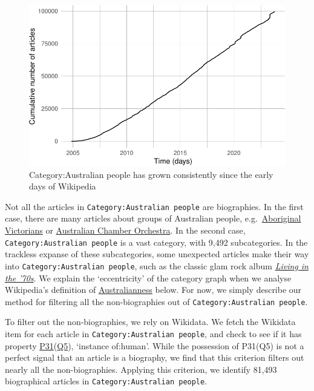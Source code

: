 \documentclass[
  a4paper,
  DIV=11,
  numbers=noendperiod]{scrreprt}
\begin{document}
\begin{figure}

{\centering \includegraphics{who-counts_files/figure-pdf/fig-included-in-ozpeople-over-time-1.pdf}

}

\caption{\label{fig-included-in-ozpeople-over-time}Category:Australian
people has grown consistently since the early days of Wikipedia}

\end{figure}

Not all the articles in \texttt{Category:Australian\ people} are
biographies. In the first case, there are many articles about groups of
Australian people,
e.g.~\href{https://en.wikipedia.org/wiki/Aboriginal_Victorians}{Aboriginal
Victorians} or
\href{https://en.wikipedia.org/wiki/Australian_Chamber_Orchestra}{Australian
Chamber Orchestra}. In the second case,
\texttt{Category:Australian\ people} is a vast category, with 9,492
subcategories. In the trackless expanse of these subcategories, some
unexpected articles make their way into
\texttt{Category:Australian\ people}, such as the classic glam rock
album
\href{https://en.wikipedia.org/wiki/Living_in_the_70\%27s}{\emph{Living
in the '70s}}. We explain the `eccentricity' of the category graph when
we analyse Wikipedia's definition of
\protect\hyperlink{australianness}{Australianness} below. For now, we
simply describe our method for filtering all the non-biographies out of
\texttt{Category:Australian\ people}.

To filter out the non-biographies, we rely on Wikidata. We fetch the
Wikidata item for each article in \texttt{Category:Australian\ people},
and check to see if it has property
\href{https://www.wikidata.org/wiki/Property:P31}{P31}(\href{https://www.wikidata.org/wiki/Q5}{Q5}),
`instance of:human'. While the possession of P31(Q5) is not a perfect
signal that an article is a biography, we find that this criterion
filters out nearly all the non-biographies. Applying this criterion, we
identify 81,493 biographical articles in
\texttt{Category:Australian\ people}.
\end{document}
